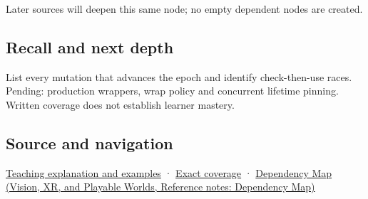 Later sources will deepen this same node; no empty dependent nodes are created.

\subsection{Recall and next depth}\label{appendix-aa405b7c3903-recall-and-next-depth}

\hypertarget{appendix-aa405b7c3903-recall-and-next-depth}{}

List every mutation that advances the epoch and identify check-then-use races. Pending: production wrappers, wrap policy and concurrent lifetime pinning. Written coverage does not establish learner mastery.

\subsection{Source and navigation}\label{appendix-aa405b7c3903-source-and-navigation}

\hypertarget{appendix-aa405b7c3903-source-and-navigation}{}

\hyperref[01-foundations-i-ch003-when-a-valid-borrow-stops-naming-the-intended-thing]{Teaching explanation and examples} · \hyperref[appendix-fd090d982a15-m008---parts-113-126]{Exact coverage} · \href{../07-Vision-XR-and-Playable-Worlds/main.pdf\#nameddest=appendix-4ad47bdd269a}{Dependency Map (Vision, XR, and Playable Worlds, Reference notes: Dependency Map)}
